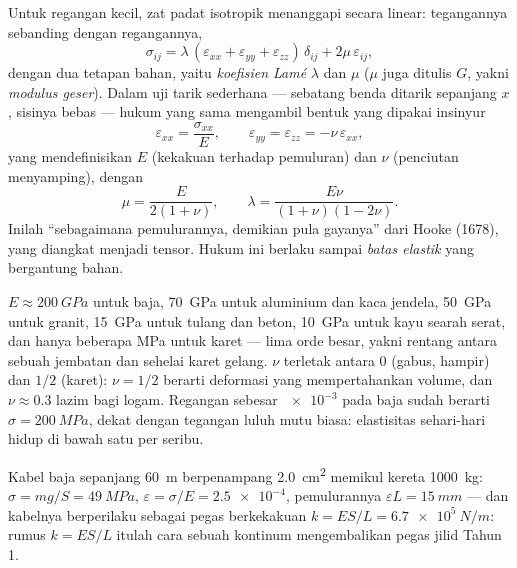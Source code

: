\begin{theorem}\label{thm:b3:continuum-elasticity:hooke}
Untuk regangan kecil, zat padat isotropik menanggapi secara linear:
tegangannya sebanding dengan regangannya,
\[
\sigma_{ij} = \lambda\,(\varepsilon_{xx} + \varepsilon_{yy} +
\varepsilon_{zz})\,\delta_{ij} + 2\mu\,\varepsilon_{ij} ,
\]
dengan dua tetapan bahan, yaitu \emph{koefisien Lamé} $\lambda$ dan
$\mu$ ($\mu$ juga ditulis $G$, yakni \emph{modulus geser}). Dalam uji
tarik sederhana --- sebatang benda ditarik sepanjang $x$, sisinya bebas
--- hukum yang sama mengambil bentuk yang dipakai insinyur
\[
\varepsilon_{xx} = \frac{\sigma_{xx}}{E} , \qquad
\varepsilon_{yy} = \varepsilon_{zz} = -\nu\,\varepsilon_{xx} ,
\]
yang mendefinisikan \emph{} $E$ (kekakuan terhadap
pemuluran) dan \emph{} $\nu$ (penciutan menyamping), dengan
\[
\mu = \frac{E}{2(1 + \nu)} , \qquad
\lambda = \frac{E\nu}{(1 + \nu)(1 - 2\nu)} .
\]
Inilah ``sebagaimana pemulurannya, demikian pula gayanya'' dari Hooke
(1678), yang diangkat menjadi tensor. Hukum ini berlaku sampai
\emph{batas elastik} yang bergantung bahan.
\end{theorem}
\admitted

\begin{remark}\label{rem:b3:continuum-elasticity:orders}
$E \approx \qty{200}{GPa}$ untuk baja, \qty{70}{GPa} untuk aluminium dan
kaca jendela, \qty{50}{GPa} untuk granit, \qty{15}{GPa} untuk tulang dan
beton, \qty{10}{GPa} untuk kayu searah serat, dan hanya beberapa MPa
untuk karet --- lima orde besar, yakni rentang antara sebuah jembatan
dan sehelai karet gelang. $\nu$ terletak antara $0$ (gabus, hampir) dan
$1/2$ (karet): $\nu = 1/2$ berarti deformasi yang mempertahankan volume,
dan $\nu \approx 0.3$ lazim bagi logam. Regangan sebesar $\num{e-3}$
pada baja sudah berarti $\sigma = \qty{200}{MPa}$, dekat dengan tegangan
luluh mutu biasa: elastisitas sehari-hari hidup di bawah satu per
seribu.
\end{remark}

\begin{example}\label{ex:b3:continuum-elasticity:cable}
Kabel baja sepanjang \qty{60}{m} berpenampang \qty{2.0}{cm^2} memikul
kereta \qty{1000}{kg}: $\sigma = mg/S = \qty{49}{MPa}$, $\varepsilon =
\sigma/E = \num{2.5e-4}$, pemulurannya $\varepsilon L = \qty{15}{mm}$ ---
dan kabelnya berperilaku sebagai pegas berkekakuan $k = ES/L =
\qty{6.7e5}{N/m}$: rumus $k = ES/L$ itulah cara sebuah kontinum
mengembalikan pegas jilid Tahun 1.
\end{example}

